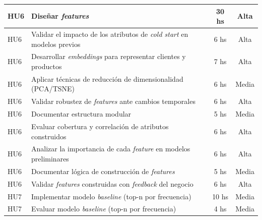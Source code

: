 \documentclass[
11pt, %
]{charter}
\begin{document}
\begin{longtable}{|p{2cm}|p{10cm}|c|c|}
HU6 & Diseñar \textit{features} & 30 hs & Alta \\ \hline
HU6 & Validar el impacto de los atributos de \textit{cold start} en modelos previos & 6 hs & Alta \\ \hline
HU6 & Desarrollar \textit{embeddings} para representar clientes y productos & 7 hs & Alta \\ \hline
HU6 & Aplicar técnicas de reducción de dimensionalidad (PCA/TSNE) & 6 hs & Media \\ \hline
HU6 & Validar robustez de \textit{features} ante cambios temporales & 6 hs & Alta \\ \hline
HU6 & Documentar estructura modular & 5 hs & Media \\ \hline
HU6 & Evaluar cobertura y correlación de atributos construidos & 6 hs & Alta \\ \hline
HU6 & Analizar la importancia de cada \textit{feature} en modelos preliminares & 6 hs & Alta \\ \hline
HU6 & Documentar lógica de construcción de \textit{features} & 5 hs & Media \\ \hline
HU6 & Validar \textit{features} construidas con \textit{feedback} del negocio & 6 hs & Alta \\ \hline

HU7 & Implementar modelo \textit{baseline} (top-n por frecuencia) & 10 hs & Media \\ \hline
HU7 & Evaluar modelo \textit{baseline} (top-n por frecuencia) & 4 hs & Media \\ \hline


\end{longtable}
\end{document}
